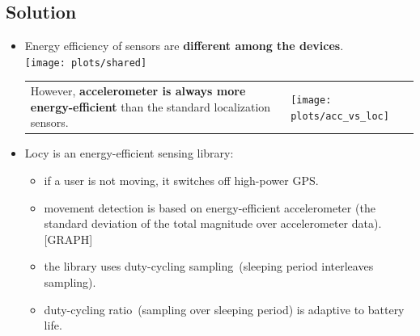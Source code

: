 \documentclass[a2,landscape]{a0poster}
\begin{document}
\mbox{}\framebreak
\begin{center}
\section*{Solution}
\end{center}
\begin{itemize}
   \item Energy efficiency of sensors are \textbf{different among the devices}.\\
   \texttt{[image: plots/shared]}

 \begin{tabular}[t]{p{8.0cm} p{9.0cm}}
       \vspace{0cm} However, \textbf{accelerometer is always more energy-efficient} than the standard localization sensors. & \vspace{0cm}\texttt{[image: plots/acc\_vs\_loc]}
      \end{tabular}

   \item Locy is an energy-efficient sensing library:
  	   \begin{itemize}		
  	   \item if a user is not moving, it switches off high-power GPS. 
  	   \item movement detection is based on energy-efficient accelerometer (the standard deviation of the total magnitude over accelerometer data). [GRAPH]
  	   \item the library uses duty-cycling sampling\ (sleeping period interleaves sampling).
  	   \item duty-cycling ratio\ (sampling over sleeping period) is adaptive to battery life. 
    \end{itemize} 
  \end{itemize}
\end{document}
